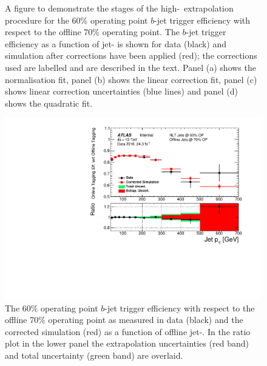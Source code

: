 \begin{figure}[!ht]
\begin{center}
\end{center}
\vspace{-0.8em}
\caption[A figure to demonstrate the stages of the high-\pT~extrapolation procedure for the $b$-jet trigger efficiency measurement.]
        {A figure to demonstrate the stages of the high-\pT~extrapolation procedure for the 60\% operating point $b$-jet trigger efficiency with respect to the offline 70\% operating point.
          The $b$-jet trigger efficiency as a function of jet-\pT{} is shown for data (black) and simulation after corrections have been applied (red);
          the corrections used are labelled and are described in the text.
          Panel (a) shows the normalisation fit,
          panel (b) shows the linear correction fit,
          panel (c) shows linear correction uncertainties (blue lines) and
          panel (d) shows the quadratic fit.
        }
        \label{fig:bTrig_mcExtrap}
\end{figure}
\begin{figure}[!ht]
\begin{center}
    \includegraphics[width=0.65\linewidth, angle=0]{figs/Trigger/fullSys_EfficiencyComp_jetPt.pdf}
  \end{center}
\vspace{-1.2em}
\caption[The $b$-jet trigger efficiency measured in data and the corrected simulation as a function of offline jet-\pT.
  The extrapolation uncertainties and total uncertainty are shown.
    \label{fig:bTrig_jetSys_effComp}]
        {
    The 60\% operating point $b$-jet trigger efficiency with respect to the offline 70\% operating point
    as measured in data (black) and the corrected simulation (red) as a function of offline jet-\pT.
    In the ratio plot in the lower panel the extrapolation uncertainties (red band) and total uncertainty (green band) are overlaid.
    \label{fig:bTrig_jetSys_effComp}
  }
\end{figure}

